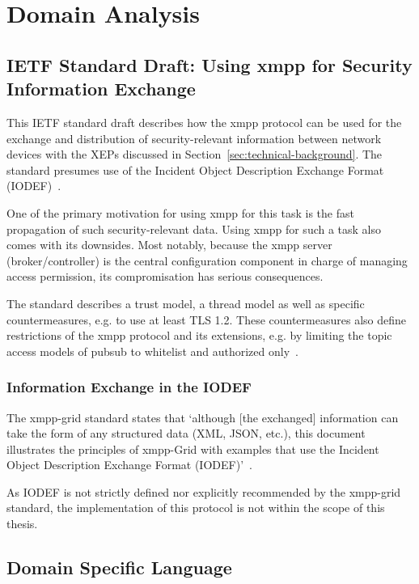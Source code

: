 \section{Domain Analysis}

\subsection{IETF Standard Draft: Using \gls{xmpp} for Security Information Exchange}\label{sec:ietf-standard-draft-using-xmpp-for-security-information-exchange}
This IETF standard draft describes how the \gls{xmpp} protocol can be used for the exchange and distribution of security-relevant information between network devices with the XEPs discussed in Section~\ref{sec:technical-background}. The standard presumes use of the Incident Object Description Exchange Format (IODEF)~\cite{rfc7970}.

One of the primary motivation for using \gls{xmpp} for this task is the fast propagation of such security-relevant data.
Using \gls{xmpp} for such a task also comes with its downsides. Most notably, because the \gls{xmpp} server (\gls{broker}/\gls{controller}) is the central configuration component in charge of managing access permission, its compromisation has serious consequences.

The standard describes a trust model, a thread model as well as specific countermeasures, e.g. to use at least TLS 1.2. These countermeasures also define restrictions of the \gls{xmpp} protocol and its extensions, e.g. by limiting the \gls{topic} access models of \gls{pubsub} to whitelist and authorized only~\cite{ietf-mile-xmpp-grid-05}.

\subsubsection{Information Exchange in the IODEF}

The \gls{xmpp-grid} standard states that `although [the exchanged] information can take the form of any structured data (XML, JSON, etc.), this document illustrates the principles of \gls{xmpp}-Grid with examples that use the Incident Object Description Exchange Format (IODEF)'~\cite{ietf-mile-xmpp-grid-05}.

As IODEF is not strictly defined nor explicitly recommended by the \gls{xmpp-grid} standard, the implementation of this protocol is not within the scope of this thesis.

\subsection{Domain Specific Language}

